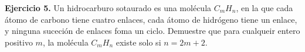 \textbf{Ejercicio 5.} Un hidrocarburo sotaurado es una molécula $C_mH_n$, 
en la que cada átomo de carbono tiene cuatro enlaces, cada átomo de hidrógeno 
tiene un enlace, y ninguna suceción de enlaces foma un ciclo. Demuestre que 
para cualqueir entero positivo $m$, la molécula $C_mH_n$ existe solo si 
$n = 2m + 2$.
